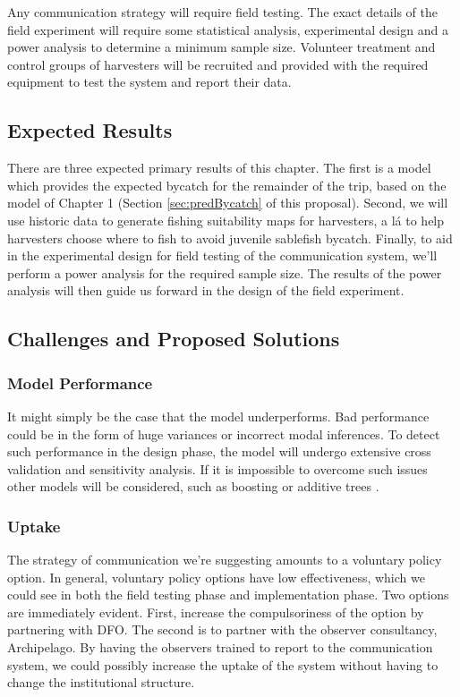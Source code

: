 \documentclass{article}
\begin{document}
Any communication strategy will require field testing. The exact details of the field experiment will require some statistical analysis, experimental design and a power analysis to determine a minimum sample size. Volunteer treatment and control groups of harvesters will be recruited and provided with the required equipment to test the system and report their data.


\subsection{Expected Results}

There are three expected primary results of this chapter. The first is a model which provides the expected bycatch for the remainder of the trip, based on the model of Chapter 1 (Section \ref{sec:predBycatch} of this proposal). Second, we will use historic data to generate fishing suitability maps for harvesters, a l\'{a} \citet{vilela2015fishing} to help harvesters choose where to fish to avoid juvenile sablefish bycatch. Finally, to aid in the experimental design for field testing of the communication system, we'll perform a power analysis for the required sample size. The results of the power analysis will then guide us forward in the design of the field experiment.

\subsection{Challenges and Proposed Solutions}

\subsubsection*{Model Performance}

It might simply be the case that the model underperforms. Bad performance could be in the form of huge variances or incorrect modal inferences. To detect such performance in the design phase, the model will undergo extensive cross validation and sensitivity analysis. If it is impossible to overcome such issues other models will be considered, such as boosting or additive trees \citep{hastie2009elements}.

\subsubsection*{Uptake}

The strategy of communication we're suggesting amounts to a voluntary policy option. In general, voluntary policy options have low effectiveness, which we could see in both the field testing phase and implementation phase. Two options are immediately evident. First, increase the compulsoriness of the option by partnering with DFO. The second is to partner with the observer consultancy, Archipelago. By having the observers trained to report to the communication system, we could possibly increase the uptake of the system without having to change the institutional structure.
\end{document}
